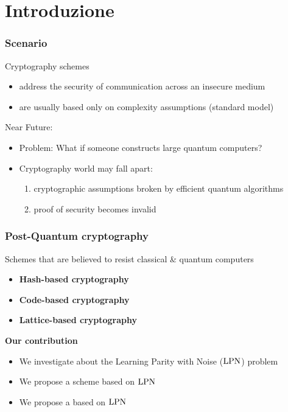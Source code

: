 \section{Introduzione}

\begin{frame}
 \frametitle{Scenario}
 
 \begin{block}{Cryptography schemes}
 \begin{itemize}
  \item address the security of communication across an insecure medium
  \item are usually based only on complexity assumptions (standard model)
 \end{itemize}
 \end{block}
 \begin{block}{Near Future:}
 \begin{itemize}
    \item \alert{Problem:} What if someone constructs large quantum computers?
    \item Cryptography world may fall apart:
    \begin{enumerate}
     \item cryptographic assumptions broken by efficient quantum algorithms
     \item proof of security becomes invalid 
    \end{enumerate}
 \end{itemize}
\end{block}

\end{frame}

\begin{frame}
\frametitle{Post-Quantum cryptography}
 Schemes that are believed to resist classical \& quantum computers
      \begin{itemize}
      \item \textbf{Hash-based cryptography}
      \item \textbf{Code-based cryptography}
      \item \alert<2->{\textbf{Lattice-based cryptography}}
      \end{itemize}
 \begin{block}{\textbf{Our contribution}}
 \begin{itemize}
  \item<2-> We investigate about the \alert{Learning Parity with Noise} ($\mathrm{LPN}$) problem
  \item<3-> We propose a {\color{blue}{Threshold Public-Key Encryption}} scheme based on $\mathrm{LPN}$
  \item<4-> We propose a {\color{blue}{Commitment protocol}} based on $\mathrm{LPN}$
 \end{itemize}

\end{block}

\end{frame}


